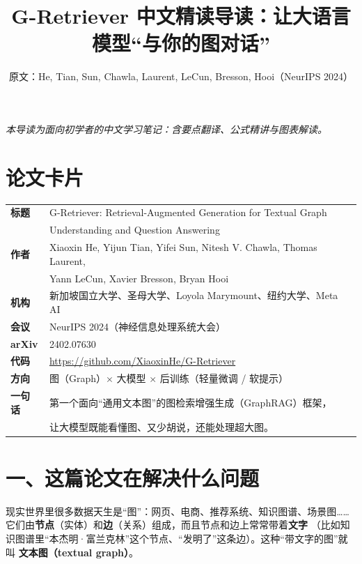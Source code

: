 \documentclass[11pt,UTF8,fontset=fandol]{ctexart}
\title{G-Retriever 中文精读导读：让大语言模型“与你的图对话”}
\author{原文：He, Tian, Sun, Chawla, Laurent, LeCun, Bresson, Hooi（NeurIPS 2024）}
\date{}
\begin{document}
\maketitle
\begin{center}\small\textit{本导读为面向初学者的中文学习笔记：含要点翻译、公式精讲与图表解读。}\end{center}

\section*{论文卡片}
\begin{center}
\begin{tabular}{@{}ll@{}}
\toprule
\textbf{标题} & G-Retriever: Retrieval-Augmented Generation for Textual Graph \\
            & Understanding and Question Answering \\
\textbf{作者} & Xiaoxin He, Yijun Tian, Yifei Sun, Nitesh V. Chawla, Thomas Laurent, \\
            & Yann LeCun, Xavier Bresson, Bryan Hooi \\
\textbf{机构} & 新加坡国立大学、圣母大学、Loyola Marymount、纽约大学、Meta AI \\
\textbf{会议} & NeurIPS 2024（神经信息处理系统大会） \\
\textbf{arXiv} & 2402.07630 \\
\textbf{代码} & \url{https://github.com/XiaoxinHe/G-Retriever} \\
\textbf{方向} & 图（Graph）$\times$ 大模型 $\times$ 后训练（轻量微调 / 软提示） \\
\textbf{一句话} & 第一个面向“通用文本图”的图检索增强生成（GraphRAG）框架，\\
              & 让大模型既能看懂图、又少胡说，还能处理超大图。 \\
\bottomrule
\end{tabular}
\end{center}

\section{一、这篇论文在解决什么问题}

现实世界里很多数据天生是“图”：网页、电商、推荐系统、知识图谱、场景图……
它们由\textbf{节点}（实体）和\textbf{边}（关系）组成，而且节点和边上常常带着\textbf{文字}
（比如知识图谱里“本杰明·富兰克林”这个节点、“发明了”这条边）。这种“带文字的图”就叫
\textbf{文本图（textual graph）}。
\end{document}

